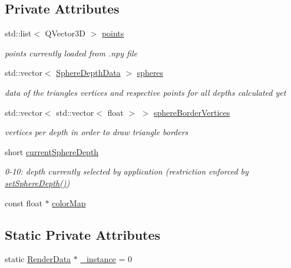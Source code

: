 \subsection*{Private Attributes}
\begin{DoxyCompactItemize}
\item 
std\+::list$<$ Q\+Vector3D $>$ \hyperlink{class_render_data_aaab890b2c9bac7bb08d5f257e98a7cb9}{points}
\begin{DoxyCompactList}\small\item\em points currently loaded from .npy file \end{DoxyCompactList}\item 
std\+::vector$<$ \hyperlink{struct_sphere_depth_data}{Sphere\+Depth\+Data} $>$ \hyperlink{class_render_data_af8d7292450ad6bba825a6dbb75be217c}{spheres}
\begin{DoxyCompactList}\small\item\em data of the triangles\textquotesingle{} vertices and respective points for all depths calculated yet \end{DoxyCompactList}\item 
std\+::vector$<$ std\+::vector$<$ float $>$ $>$ \hyperlink{class_render_data_aadf6eefa26ab7f440571b651d38d6e0e}{sphere\+Border\+Vertices}
\begin{DoxyCompactList}\small\item\em vertices per depth in order to draw triangle borders \end{DoxyCompactList}\item 
short \hyperlink{class_render_data_addeb27eb3a3e9c8bf50a3615fbcc8752}{current\+Sphere\+Depth}
\begin{DoxyCompactList}\small\item\em 0-\/10\+: depth currently selected by application (restriction enforced by \hyperlink{class_render_data_a8d5f7285d29dc9ca0f93fcf2b5826283}{set\+Sphere\+Depth()}) \end{DoxyCompactList}\item 
const float $\ast$ \hyperlink{class_render_data_a78b66cb01444d2d36c3ed9179705a716}{color\+Map}
\end{DoxyCompactItemize}
\subsection*{Static Private Attributes}
\begin{DoxyCompactItemize}
\item 
static \hyperlink{class_render_data}{Render\+Data} $\ast$ \hyperlink{class_render_data_a133da67a805762c95284248a7ea1526c}{\+\_\+instance} = 0
\end{DoxyCompactItemize}


